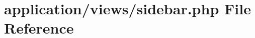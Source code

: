 \hypertarget{sidebar_8php}{}\section{application/views/sidebar.php File Reference}
\label{sidebar_8php}
